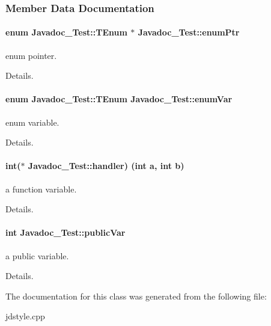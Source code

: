 \subsubsection{Member Data Documentation}
\paragraph[{\texorpdfstring{enum\+Ptr}{enumPtr}}]{\setlength{\rightskip}{0pt plus 5cm}enum {\bf Javadoc\+\_\+\+Test\+::\+T\+Enum} 
       $\ast$ Javadoc\+\_\+\+Test\+::enum\+Ptr}\hypertarget{class_javadoc___test_abcb36df9d8af3e69290c239ba483d6df}{}\label{class_javadoc___test_abcb36df9d8af3e69290c239ba483d6df}


enum pointer. 

Details. 
\paragraph[{\texorpdfstring{enum\+Var}{enumVar}}]{\setlength{\rightskip}{0pt plus 5cm}enum {\bf Javadoc\+\_\+\+Test\+::\+T\+Enum}
        Javadoc\+\_\+\+Test\+::enum\+Var}\hypertarget{class_javadoc___test_a689558649150237b53a5c8ed89c996c2}{}\label{class_javadoc___test_a689558649150237b53a5c8ed89c996c2}


enum variable. 

Details. 
\paragraph[{\texorpdfstring{handler}{handler}}]{\setlength{\rightskip}{0pt plus 5cm}int($\ast$ Javadoc\+\_\+\+Test\+::handler) (int a, int b)}\hypertarget{class_javadoc___test_ace81a523a4eef44501a841a6d338832b}{}\label{class_javadoc___test_ace81a523a4eef44501a841a6d338832b}


a function variable. 

Details. 
\paragraph[{\texorpdfstring{public\+Var}{publicVar}}]{\setlength{\rightskip}{0pt plus 5cm}int Javadoc\+\_\+\+Test\+::public\+Var}\hypertarget{class_javadoc___test_a44a516fbc3a4865e2dcae34649c9df6a}{}\label{class_javadoc___test_a44a516fbc3a4865e2dcae34649c9df6a}


a public variable. 

Details. 

The documentation for this class was generated from the following file\+:\begin{DoxyCompactItemize}
\item 
jdstyle.\+cpp\end{DoxyCompactItemize}
